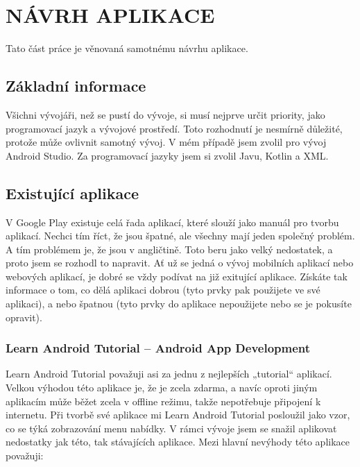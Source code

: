 \documentclass{vskpou} %
\begin{document}
\section{NÁVRH APLIKACE}
Tato část práce je věnovaná samotnému návrhu aplikace.
%
\subsection{Základní informace}
Všichni vývojáři, než se pustí do vývoje, si musí nejprve určit priority, jako programovací jazyk a vývojové prostředí.  Toto rozhodnutí je nesmírně důležité, protože může ovlivnit samotný vývoj. V mém případě jsem zvolil pro vývoj Android Studio. Za programovací jazyky jsem si zvolil Javu, Kotlin a XML. 

\subsection{Existující aplikace }
V Google Play existuje celá řada aplikací, které slouží jako manuál pro tvorbu aplikací. Nechci tím říct, že jsou špatné, ale všechny mají jeden společný problém. A tím problémem je, že jsou v angličtině. Toto beru jako velký nedostatek, a proto jsem se rozhodl to napravit. Ať už se jedná o vývoj mobilních aplikací nebo webových aplikací, je dobré se vždy podívat na již exitující aplikace. Získáte tak informace o tom, co dělá aplikaci dobrou (tyto prvky pak použijete ve své aplikaci), a nebo špatnou (tyto prvky do aplikace nepoužijete nebo se je pokusíte opravit).

\subsubsection{Learn Android Tutorial – Android App Development}
Learn Android Tutorial považuji asi za jednu z nejlepších „tutorial“ aplikací. Velkou výhodou této aplikace je, že je zcela zdarma, a navíc oproti jiným aplikacím může běžet zcela v offline režimu, takže nepotřebuje připojení k internetu. Při tvorbě své aplikace mi Learn Android Tutorial posloužil jako vzor, co se týká zobrazování menu nabídky. V rámci vývoje jsem se snažil aplikovat nedostatky jak této, tak stávajících aplikace. Mezi hlavní nevýhody této aplikace považuji:
\end{document}

